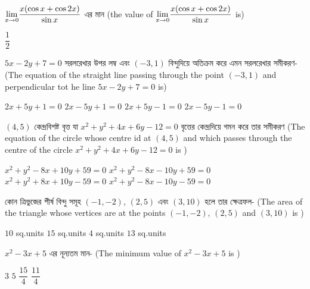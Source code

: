 \documentclass[addpoints]{exam}
\begin{document}
\begin{questions}
\question $ \mathlarger{\lim_{x\to 0}}\dfrac{x(\cos x +\cos 2x)}{\sin x} $ এর মান (the value of $ \mathlarger{\lim_{x\to 0}}\dfrac{x(\cos x +\cos 2x)}{\sin x} $ is)

\begin{oneparchoices}
\choice $ \dfrac{1}{2} $
\end{oneparchoices}

\question   $ 5x-2y+7=0 $ সরলরেখার উপর লম্ব এবং $ (-3,1) $ বিন্দুদিয়ে অতিক্রম করে এমন সরলরেখার সমীকরণ- (The equation of the straight line passing through the point $ (-3,1) $ and perpendicular tot he line $ 5x-2y+7=0 $ is)

\begin{oneparchoices}
\choice $ 2x+5y+1=0 $
\choice $ 2x-5y+1=0 $
\choice $ 2x+5y-1=0 $
\choice $ 2x-5y-1=0 $
\end{oneparchoices}

\question $ (4,5) $ কেন্দ্রবিশষ্ট বৃত্ত যা $ x^{2}+y^{2}+4x+6y-12=0 $ বৃত্তের কেন্দ্রদিয়ে গমন করে তার সমীকরণ (The equation of the circle whose centre id at $ (4,5) $ and which passes through the centre of the circle $ x^{2}+y^{2}+4x+6y-12=0 $ is )


\begin{oneparchoices}
\choice $ x^{2}+y^{2}-8x+10y+59=0 $
\choice $ x^{2}+y^{2}-8x-10y+59=0 $
\choice $ x^{2}+y^{2}+8x+10y-59=0 $
\choice $ x^{2}+y^{2}-8x-10y-59=0 $
\end{oneparchoices}

\question  কোন ত্রিভুজের শীর্ষ বিন্দু সমূহ $ (-1,-2),\,(2,5) $ এবং $ (3,10) $ হলে তার ক্ষেত্রফল- (The area of the triangle whose vertices are at the points $ (-1,-2),\,(2,5) $ and $ (3,10) $ is  )

\begin{oneparchoices}
\choice $ 10 $ sq.units
\choice $ 15 $ sq.units
\choice $ 4 $ sq.units
\choice $ 13 $ sq.units
\end{oneparchoices}

\question $ x^{2}-3x+5 $ এর নূন্যতম মান- (The minimum value of $ x^{2}-3x+5 $ is ) 

\begin{oneparchoices}
\choice $ 3 $
\choice $ 5 $
\choice $ \dfrac{15}{4} $
\choice $ \dfrac{11}{4} $
\end{oneparchoices}

\end{questions}
\end{document}
